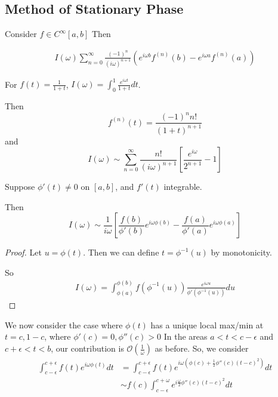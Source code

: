\documentclass[a4paper]{article}
\begin{document}
\subsection{Method of Stationary Phase}

\begin{prop}
	Consider $f \in C^{\infty}[a,b]$ Then

	\begin{align*}
		I(\omega) \sum_{n=0}^{\infty} \frac{(-1)^{n}}{(i\omega)^{n+1}} \left( e^{i\omega b} f^{(n)}(b) - e^{i\omega a} f^{(n)}(a) \right) 
	\end{align*}
\end{prop}

\begin{ex}
	For $f(t) = \frac{1}{1+t}$, $I(\omega) = \int_0^{1} \frac{e^{i\omega t}}{ 1+t} dt$.

	Then  \[
		f^{(n)} (t) = \frac{(-1)^{n}n!}{(1+t)^{n+1}}
	\]
	and
	\[
		I(\omega) \sim \sum_{n=0}^{\infty} \frac{n!}{(i\omega)^{n+1}} \left[ \frac{e^{i\omega}}{2^{n+1}} - 1 \right] 
	\] 
\end{ex}

\begin{prop}
	Suppose $\phi'(t) \neq 0$ on $[a,b]$, and $f'(t)$ integrable.

	Then
	\[
		I(\omega) \sim  \frac{1}{i\omega} \left[ \frac{f(b)}{\phi'(b)} e^{i\omega \phi(b)} - \frac{f(a)}{\phi'(a)} e^{i\omega \phi(a)} \right] 
	\] 
\end{prop}

\begin{proof}
	Let $u=\phi(t)$. Then we can define $t = \phi^{-1}(u)$ by monotonicity.

	So
	\begin{align*}
		I(\omega) = \int_{\phi(a)}^{\phi(b)} f(\phi^{-1}(u)) \frac{e^{i\omega u}}{\phi'(\phi^{-1}(u))} du
	\end{align*}
\end{proof}

We now consider the case where $\phi(t)$ has a unique local max/min at $t=c, 1-c$, where  $\phi'(c) = 0, \phi''(c) > 0$
In the areas $a<t<c-\epsilon$ and $c+\epsilon<t<b$, our contribution is $\mathcal{O}(\frac{1}{\omega})$ as before. So, we consider
\begin{align*}
	\int_{c-\epsilon}^{c+\epsilon} f(t)e^{i\omega \phi(t)} dt &= \int_{c-\epsilon}^{c+\epsilon} f(t) e^{i\omega \left( \phi(c) + \frac{1}{2}\phi''(c)(t-c)^2 \right) } dt \\
	&\sim f(c) \int_{c-\epsilon}^{c+\omega} e^{i\frac{\omega}{2} \phi''(c) (t-c)^2} dt  \\
\end{align*}
\end{document}
